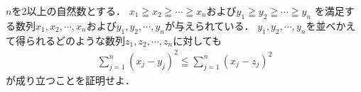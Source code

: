 \documentclass[../../main.tex]{subfiles}
\begin{document}
$n$を2以上の自然数とする．
$x_1 \geqq x_2 \geqq \cdots \geqq x_n$および$y_1 \geqq y_2 \geqq \cdots \geqq y_n$
を満足する数列$x_1,x_2,\cdots,x_n$および$y_1,y_2,\cdots,y_n$が与えられている．
$y_1,y_2,\cdots,y_n$を並べかえて得られるどのような数列$z_1,z_2,\cdots,z_n$に対しても
\begin{align*}
  \sum_{j=1}^n (x_j-y_j)^2 \leqq \sum_{j=1}^n (x_j-z_j)^2
\end{align*}
が成り立つことを証明せよ．
\end{document}
